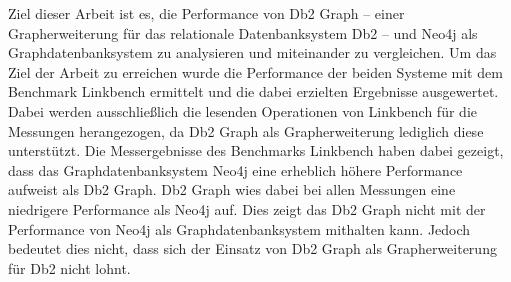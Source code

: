 Ziel dieser Arbeit ist es, die Performance von Db2 Graph -- einer Grapherweiterung für das relationale Datenbanksystem Db2 -- und Neo4j als Graphdatenbanksystem zu analysieren und miteinander zu vergleichen. Um das Ziel der Arbeit zu erreichen wurde die Performance der beiden Systeme mit dem Benchmark Linkbench ermittelt und die dabei erzielten Ergebnisse ausgewertet. Dabei werden ausschließlich die lesenden Operationen von Linkbench für die Messungen herangezogen, da Db2 Graph als Grapherweiterung lediglich diese unterstützt. Die Messergebnisse des Benchmarks Linkbench haben dabei gezeigt, dass das Graphdatenbanksystem Neo4j eine erheblich höhere Performance aufweist als Db2 Graph. Db2 Graph wies dabei bei allen Messungen eine niedrigere Performance als Neo4j auf. Dies zeigt das Db2 Graph nicht mit der Performance von Neo4j als Graphdatenbanksystem mithalten kann. Jedoch bedeutet dies nicht, dass sich der Einsatz von Db2 Graph als Grapherweiterung für Db2 nicht lohnt.